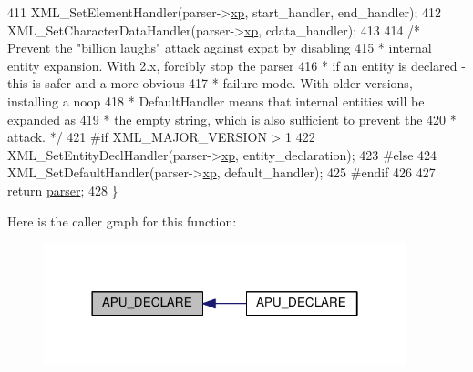 \begin{DoxyCode}
411     XML\_SetElementHandler(parser->\hyperlink{structapr__xml__parser_a89f057a36ac193b51a002780f9845a45}{xp}, start\_handler, end\_handler);
412     XML\_SetCharacterDataHandler(parser->\hyperlink{structapr__xml__parser_a89f057a36ac193b51a002780f9845a45}{xp}, cdata\_handler);
413 
414     \textcolor{comment}{/* Prevent the "billion laughs" attack against expat by disabling}
415 \textcolor{comment}{     * internal entity expansion.  With 2.x, forcibly stop the parser}
416 \textcolor{comment}{     * if an entity is declared - this is safer and a more obvious}
417 \textcolor{comment}{     * failure mode.  With older versions, installing a noop}
418 \textcolor{comment}{     * DefaultHandler means that internal entities will be expanded as}
419 \textcolor{comment}{     * the empty string, which is also sufficient to prevent the}
420 \textcolor{comment}{     * attack. */}
421 \textcolor{preprocessor}{#if XML\_MAJOR\_VERSION > 1}
422     XML\_SetEntityDeclHandler(parser->\hyperlink{structapr__xml__parser_a89f057a36ac193b51a002780f9845a45}{xp}, entity\_declaration);
423 \textcolor{preprocessor}{#else}
424     XML\_SetDefaultHandler(parser->\hyperlink{structapr__xml__parser_a89f057a36ac193b51a002780f9845a45}{xp}, default\_handler);
425 \textcolor{preprocessor}{#endif}
426 
427     \textcolor{keywordflow}{return} \hyperlink{group__APR__Util__XML_ga770a26ab91fad38f2253d5450d6e600e}{parser};
428 \}
\end{DoxyCode}


Here is the caller graph for this function\+:
\nopagebreak
\begin{figure}[H]
\begin{center}
\leavevmode
\includegraphics[width=298pt]{group__APR__Util__XML_ga1818ae6fe9e2acebf10006bd3fc7197a_icgraph}
\end{center}
\end{figure}


